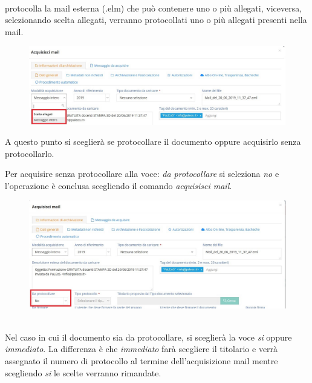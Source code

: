 \documentclass[a4paper,italian,12pt]{book}
\begin{document}
\begin{itemize}
\begin{figure}[ht]
\end{figure}\\ 
protocolla la mail esterna (.elm) che può contenere uno o più allegati, viceversa, selezionando scelta allegati, verranno protocollati uno o più allegati presenti nella mail.
\begin{figure}[ht]
\centering
\includegraphics[scale=0.5]{Figure/mod_scelt_all.jpg} 
\end{figure} 
\end{itemize} 
\newpage
A questo punto si sceglierà se protocollare il documento oppure acquisirlo senza protocollarlo.

Per acquisire senza protocollare alla voce: \textit{da protocollare} si seleziona \textit{no} e l'operazione è conclusa scegliendo il comando \textit{acquisisci mail}.
\begin{figure}[ht]
\centering
\includegraphics[scale=0.5]{Figure/da_protocollare.jpg} 
\end{figure}\\

Nel caso in cui il documento sia da protocollare, si sceglierà la voce \textit{si} oppure \textit{immediato}.
La differenza è che \textit{immediato} farà scegliere il titolario e verrà assegnato il numero di protocollo al termine dell'acquisizione mail mentre scegliendo \textit{si} le scelte verranno rimandate.
\end{document}
